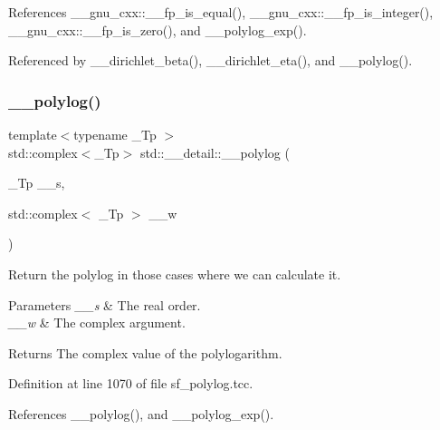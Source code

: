 References \+\_\+\+\_\+gnu\+\_\+cxx\+::\+\_\+\+\_\+fp\+\_\+is\+\_\+equal(), \+\_\+\+\_\+gnu\+\_\+cxx\+::\+\_\+\+\_\+fp\+\_\+is\+\_\+integer(), \+\_\+\+\_\+gnu\+\_\+cxx\+::\+\_\+\+\_\+fp\+\_\+is\+\_\+zero(), and \+\_\+\+\_\+polylog\+\_\+exp().



Referenced by \+\_\+\+\_\+dirichlet\+\_\+beta(), \+\_\+\+\_\+dirichlet\+\_\+eta(), and \+\_\+\+\_\+polylog().

\mbox{\label{namespacestd_1_1____detail_aa14e3ca6e4bee5ac1f1e5e1c2cee1d5a}} 
\subsubsection{\texorpdfstring{\+\_\+\+\_\+polylog()}{\_\_polylog()}\hspace{0.1cm}{\footnotesize\ttfamily [2/2]}}
{\footnotesize\ttfamily template$<$typename \+\_\+\+Tp $>$ \\
std\+::complex$<$\+\_\+\+Tp$>$ std\+::\+\_\+\+\_\+detail\+::\+\_\+\+\_\+polylog (\begin{DoxyParamCaption}\item[{\+\_\+\+Tp}]{\+\_\+\+\_\+s,  }\item[{std\+::complex$<$ \+\_\+\+Tp $>$}]{\+\_\+\+\_\+w }\end{DoxyParamCaption})}

Return the polylog in those cases where we can calculate it.


\begin{DoxyParams}{Parameters}
{\em \+\_\+\+\_\+s} & The real order. \\
\hline
{\em \+\_\+\+\_\+w} & The complex argument. \\
\hline
\end{DoxyParams}
\begin{DoxyReturn}{Returns}
The complex value of the polylogarithm. 
\end{DoxyReturn}


Definition at line 1070 of file sf\+\_\+polylog.\+tcc.



References \+\_\+\+\_\+polylog(), and \+\_\+\+\_\+polylog\+\_\+exp().

\mbox{\label{namespacestd_1_1____detail_a0f6f2fc92d4ccec43975a6b9aca9851a}} 
